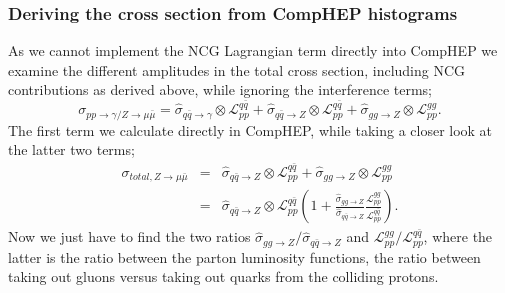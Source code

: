 \subsubsection{Deriving the cross section from CompHEP histograms}
As we cannot implement the NCG Lagrangian term directly into CompHEP we examine the different amplitudes in the total cross section, including NCG contributions as derived above, while ignoring the interference terms;
\begin{equation}
	\sigma_{pp \rightarrow \gamma/ Z \rightarrow \mu \bar \mu} = \hat \sigma_{q \bar q \rightarrow \gamma} \otimes \mathcal{L}_{pp}^{q \bar q}+ \hat \sigma_{q \bar q \rightarrow Z} \otimes \mathcal{L}_{pp}^{q \bar q}+ \hat \sigma_{gg \rightarrow Z} \otimes \mathcal{L}_{pp}^{gg}.
\end{equation}
The first term we calculate directly in CompHEP, while taking a closer look at the latter two terms; 
\begin{eqnarray} \label{eq:qqggztotal}
	\sigma_{total, Z \rightarrow \mu \bar \mu} &=& \hat \sigma_{q \bar q \rightarrow Z} \otimes \mathcal{L}_{pp}^{q \bar q}+ \hat \sigma_{gg \rightarrow Z} \otimes \mathcal{L}_{pp}^{gg} \nonumber \\
	&=&\hat \sigma_{q \bar q \rightarrow Z} \otimes \mathcal{L}_{pp}^{q \bar q} \left (1+ \frac{\hat \sigma_{gg \rightarrow Z}}{\hat \sigma_{q \bar q \rightarrow Z}} \frac{\mathcal{L}_{pp}^{gg}} {\mathcal{L}_{pp}^{q \bar q}} \right ).
\end{eqnarray}
Now we just have to find the two ratios ${\hat \sigma_{gg \rightarrow Z}}/{\hat \sigma_{q \bar q \rightarrow Z}}$ and ${\mathcal{L}_{pp}^{gg}}/{\mathcal{L}_{pp}^{q \bar q}}$, where the latter is the ratio between the parton luminosity functions, the ratio between taking out gluons versus taking out quarks from the colliding protons.

